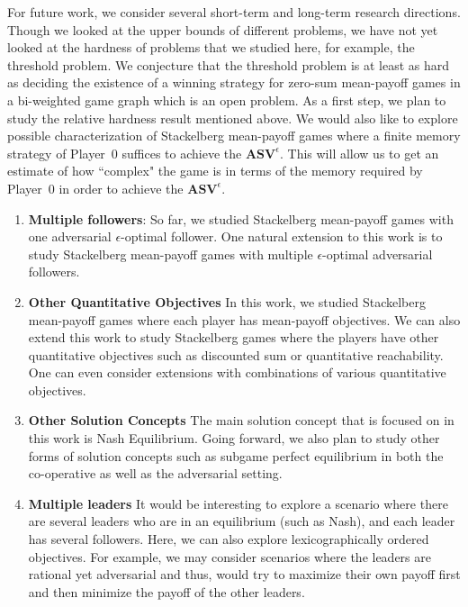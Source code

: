 For future work, we consider several short-term and long-term research directions.
Though we looked at the upper bounds of different problems, we have not yet looked at the hardness of problems that we studied here, for example, the threshold problem.
We conjecture that the threshold problem is at least as hard as deciding the existence of a winning strategy for zero-sum mean-payoff games in a bi-weighted game graph which is an open problem.
As a first step, we plan to study the relative hardness result mentioned above.
We would also like to explore possible characterization of Stackelberg mean-payoff games where a finite memory strategy of Player~$0$ suffices to achieve the $\mathbf{ASV}^{\epsilon}$.
This will allow us to get an estimate of how ``complex" the game is in terms of the memory required by Player~$0$ in order to achieve the $\mathbf{ASV}^{\epsilon}$.
\begin{enumerate}
    \item \textbf{Multiple followers}: So far, we studied Stackelberg mean-payoff games with one adversarial $\epsilon$-optimal follower. One natural extension to this work is to study Stackelberg mean-payoff games with multiple $\epsilon$-optimal adversarial followers.
    \item \textbf{Other Quantitative Objectives} In this work, we studied Stackelberg mean-payoff games where  each player has mean-payoff objectives. We can also extend this work to study Stackelberg games where the players have other quantitative objectives such as discounted sum or quantitative reachability.
    One can even consider extensions with combinations of various quantitative objectives.
    \item \textbf{Other Solution Concepts} The main solution concept that is focused on in this work is Nash Equilibrium. Going forward, we also plan to study other forms of solution concepts such as subgame perfect equilibrium in both the co-operative as well as the adversarial setting.
    \item \textbf{Multiple leaders} It would be interesting to explore a scenario where there are several leaders who are in an equilibrium (such as Nash), and each leader has several followers. Here, we can also explore lexicographically ordered objectives. For example, we may consider scenarios where the leaders are rational yet adversarial and thus, would try to maximize their own payoff first and then minimize the payoff of the other leaders. 
\end{enumerate}
